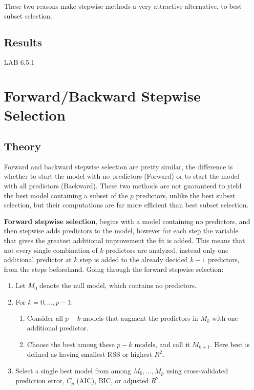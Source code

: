 These two reasons make stepwise methods a very attractive alternative, to best subset selection. 

\subsection{Results}
LAB 6.5.1

\section{Forward/Backward Stepwise Selection}
\subsection{Theory}
Forward and backward stepwise selection are pretty similar, the difference is whether to start the model with no predictors (Forward) or to start the model with all predictors (Backward). These two methods are not guaranteed to yield the best model containing a subset of the $p$ predictors, unlike the best subset selection, but their computations are far more efficient than best subset selection.

\textbf{Forward stepwise selection}, begins with a model containing no predictors, and then stepwise adds predictors to the model, however for each step the variable that gives the greatest additional improvement the fit is added. This means that not every single combination of $k$ predictors are analyzed, instead only one additional predictor at $k$ step is added to the already decided $k-1$ predictors, from the steps beforehand. Going through the forward stepwise selection:
\begin{enumerate}
	\item Let $M_0$ denote the null model, which contains no predictors.
	\item For $k=0,\dots,p-1$:
	\begin{enumerate}
		\item Consider all $p-k$ models that augment the predictors in $M_k$ with one additional predictor.
		\item Choose the best among these $p-k$ models, and call it $M_{k+1}$. Here best is defined as having smallest RSS or highest $R^2$.
	\end{enumerate}
	\item Select a single best model from among $M_0,\dots,M_p$ using cross-validated prediction error, $C_p$ (AIC), BIC, or adjusted $R^2$. 
\end{enumerate}

